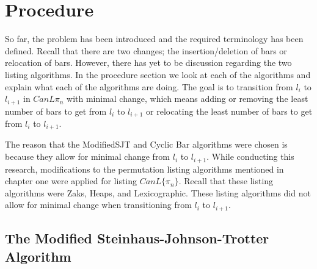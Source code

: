 

\section{Procedure}

So far, the problem has been introduced and the required terminology has been defined. Recall that there are two 
changes; the insertion/deletion of bars or relocation of bars.
However, there has yet to be discussion regarding the two 
listing algorithms. In the procedure section 
we look at each of the algorithms and explain what 
each of the algorithms are doing. The goal is to transition from 
$l_{i}$ to $l_{i+1}$ in $CanL{\pi_{n}}$ with minimal change, which means adding or removing 
the least number of bars to get from $l_{i}$ to $l_{i+1}$ or relocating 
the least number of bars to get from $l_{i}$ to $l_{i+1}$.\par 

The reason that the {\sc ModifiedSJT} and {\sc Cyclic Bar} algorithms were chosen is because they allow 
for minimal change from $l_{i}$ to $l_{i+1}$. While conducting this research, modifications 
to the permutation listing algorithms mentioned in chapter one were applied for listing $CanL\{\pi_{n}\}$. Recall that 
these listing algorithms were Zaks, Heaps, and Lexicographic. These listing algorithms 
did not allow for minimal change when transitioning from $l_{i}$ to $l_{i+1}$.
\subsection{The Modified Steinhaus-Johnson-Trotter Algorithm}

